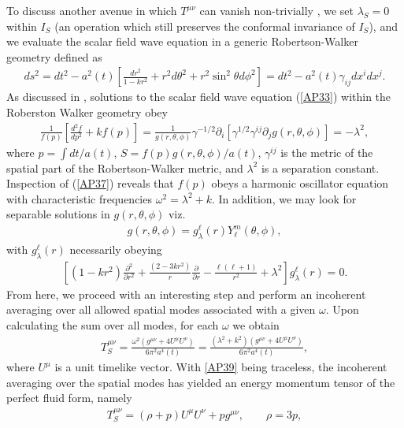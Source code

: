 To discuss another avenue in which $T^{\mu\nu}$ can vanish non-trivially \cite{mannheim_2000}, we set $\lambda_S=0$ within $I_S$ (an operation which still preserves the conformal invariance of $I_S$), and we evaluate the scalar field wave equation in a generic Robertson-Walker geometry defined as
%
\begin{eqnarray}
ds^2=dt^2-a^2(t)\left[\frac{dr^2}{1-kr^2}+r^2d\theta^2+r^2\sin^2\theta d\phi^2\right]
=dt^2-a^2(t)\gamma_{ij}dx^idx^j.
\label{AP36}
\end{eqnarray}
%
As discussed in \cite{mannheim_2000}, solutions to the scalar field wave equation (\ref{AP33}) within the Roberston Walker geometry obey
%
\begin{eqnarray}
\frac{1}{f(p)}\left[\frac{d^2f}{dp^2}+kf(p)\right]=\frac{1}{g(r,\theta,\phi)}\gamma^{-1/2}\partial_i[\gamma^{1/2}\gamma^{ij}\partial_jg(r,\theta,\phi)]=-\lambda^2,
\label{AP37}
\end{eqnarray}
%
where $p=\int dt/a(t)$, $S=f(p)g(r,\theta,\phi)/a(t)$, $\gamma^{ij}$ is the metric of the spatial part of the Robertson-Walker metric, and $\lambda^2$ is a separation constant. Inspection of (\ref{AP37}) reveals that $f(p)$ obeys a harmonic oscillator equation with characteristic frequencies $\omega^2=\lambda^2+k$. In addition, we may look for separable solutions in $g(r,\theta,\phi)$ viz.
\begin{eqnarray}
g(r,\theta,\phi)=g^{\ell}_{\lambda}(r)Y^m_{\ell}(\theta,\phi),
\end{eqnarray}
with $g^{\ell}_{\lambda}(r)$ necessarily obeying
%
\begin{eqnarray}
\left[(1-kr^2)\frac{\partial^2}{\partial r^2}+\frac{(2-3kr^2)}{r}\frac{\partial}{\partial r}-\frac{\ell(\ell+1)}{r^2}+\lambda^2\right]g^{\ell}_{\lambda}(r)=0.
\label{AP38}
\end{eqnarray}
%
From here, we proceed with an interesting step and perform an incoherent averaging over all allowed spatial modes associated with a given $\omega$. Upon calculating the sum over all modes, for each $\omega$ we obtain  \cite{mannheim_2000}  
%
\begin{eqnarray}
T_S^{\mu\nu}=\frac{\omega^2(g^{\mu\nu}+4U^{\mu}U^{\nu})}{6\pi^2a^4(t)}=
\frac{(\lambda^2+k^2)(g^{\mu\nu}+4U^{\mu}U^{\nu})}{6\pi^2a^4(t)},
\label{AP39}
\end{eqnarray}
%
where $U^{\mu}$ is a unit timelike vector. With \eqref{AP39} being traceless, the incoherent averaging over the spatial modes has yielded an energy momentum tensor of the perfect fluid form, namely
\begin{eqnarray}
T_S^{\mu\nu} = (\rho+p)U^\mu U^\nu + p g^{\mu\nu},\qquad \rho = 3p,
\end{eqnarray}

